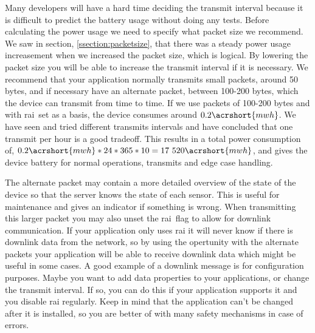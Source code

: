 \documentclass[USenglish]{ifimaster}  %
\begin{document}
Many developers will have a hard time deciding the transmit interval because it is difficult to predict the battery usage without doing any tests. Before calculating the power usage we need to specify what packet size we recommend. We saw in section, \vref{ssection:packetsize}, that there was a steady power usage increasement when we increased the packet size, which is logical. By lowering the packet size you will be able to increase the transmit interval if it is necessary. We recommend that your application normally transmits small packets, around 50 bytes, and if necessary have an alternate packet, between 100-200 bytes, which the device can transmit from time to time. If we use packets of 100-200 bytes and with \acrshort{rai} set as a basis, the device consumes around ${0.2 \acrshort{mwh}}$\cite{online:result8}. We have seen and tried different transmits intervals and have concluded that one transmit per hour is a good tradeoff. This results in a total power consumption of, ${ 0.2\acrshort{mwh} * 24 * 365 * 10 = 17 520 \acrshort{mwh}}$, and gives the device battery for normal operations, transmits and edge case handling.

The alternate packet may contain a more detailed overview of the state of the device so that the server knows the state of each sensor. This is useful for maintenance and gives an indicator if something is wrong. When transmitting this larger packet you may also unset the \acrshort{rai} flag to allow for downlink communication. If your application only uses \acrshort{rai} it will never know if there is downlink data from the network, so by using the opertunity with the alternate packets your application will be able to receive downlink data which might be useful in some cases. A good example of a downlink message is for configuration purposes. Maybe you want to add data properties to your applications, or change the transmit interval. If so, you can do this if your application supports it and you disable \acrshort{rai} regularly. Keep in mind that the application can't be changed after it is installed, so you are better of with many safety mechanisms in case of errors.
\end{document}
